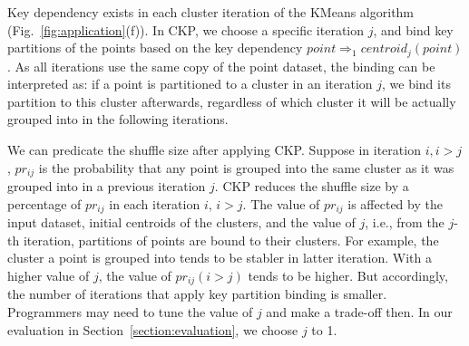 \documentclass[10pt,journal,compsoc]{IEEEtran}
\newcommand{\red}[1]{\textcolor{red}{#1}}
\begin{document}
Key dependency exists in each cluster iteration of the KMeans algorithm (Fig.~\ref{fig:application}(f)).
In CKP, we choose a specific iteration $j$, and bind key partitions of 
the points based on the key dependency $point \Rightarrow_1 centroid_j(point)$.
As all iterations use the same copy of the point dataset,
the binding can be interpreted as: if a point is partitioned to a cluster 
in an iteration $j$, 
we bind its partition to this cluster afterwards,
regardless of which cluster it will be actually grouped into in the following iterations.

We can predicate the shuffle size after applying CKP.
Suppose in iteration $i, i > j$, 
$pr_{ij}$ is the probability that any point is grouped 
into the same cluster as it was grouped into in a previous iteration $j$.
CKP reduces the shuffle size by a percentage of $pr_{ij}$ in each iteration $i$, $i>j$. 
The value of $pr_{ij}$ is affected by the input dataset, initial
centroids of the clusters, and the value of $j$, 
i.e., from the $j$-th iteration, partitions of points are bound to their
clusters.
For example, the cluster a point is grouped into tends to be stabler in latter iteration. With a higher value of $j$, 
the value of $pr_{ij} (i > j)$ tends to be higher.
But accordingly, the number of iterations that apply key partition 
binding is smaller. 
Programmers may need to tune the value of $j$ and make a trade-off then. 
In our evaluation in Section~\ref{section:evaluation}, we choose $j$ to 1.


\end{document}
